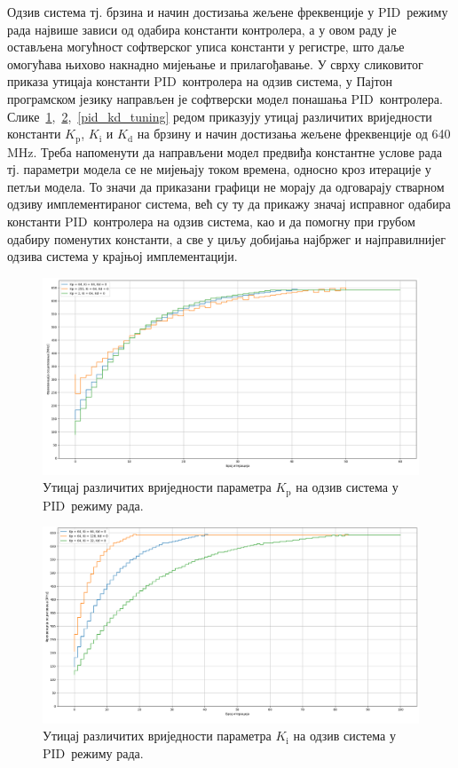 \documentclass[master]{finthesis}
\def \PID  {PID} %
\begin{document}
Одзив система тј. брзина и начин достизања жељене фреквенције у \PID\ режиму рада највише зависи од одабира константи контролера, а у овом раду је остављена могућност софтверског уписа константи у регистре, што даље омогућава њихово накнадно мијењање и прилагођавање. У сврху сликовитог приказа утицаја константи \PID\ контролера на одзив система, у Пајтон програмском језику направљен је софтверски модел понашања \PID\ контролера. Слике~\ref{pid_kp_tuning},~\ref{pid_ki_tuning},~\ref{pid_kd_tuning} редом приказују утицај различитих вриједности константи $K_\text{p}$, $K_\text{i}$ и $K_\text{d}$ на брзину и начин достизања жељене фреквенције од 640\,MHz. Треба напоменути да направљени модел предвиђа константне услове рада тј. параметри модела се не мијењају током времена, односно кроз итерације у петљи модела. То значи да приказани графици не морају да одговарају стварном одзиву имплементираног система, већ су ту да прикажу значај исправног одабира константи \PID\ контролера на одзив система, као и да помогну при грубом одабиру поменутих константи, а све у циљу добијања најбржег и најправилнијег одзива система у крајњој имплементацији.  
% 
\begin{figure}[!ht]
	 \centering
	 \includegraphics[scale=0.2]{slike/pid_kp_tuning.png}
	 \caption{Утицај различитих вриједности параметра $K_\text{p}$ на одзив система у \PID\ режиму рада.}
	 \label{pid_kp_tuning}
\end{figure}
% 
\begin{figure}[!ht]
	 \centering
	 \includegraphics[scale=0.2]{slike/pid_ki_tuning.png}
    	 \caption{Утицај различитих вриједности параметра $K_\text{i}$ на одзив система у \PID\ режиму рада.}
    	 \label{pid_ki_tuning}
\end{figure}
\end{document}
